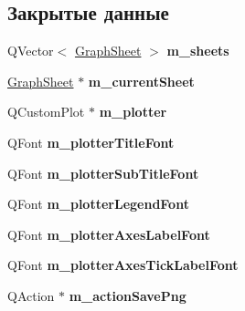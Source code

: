 \subsection*{Закрытые данные}
\begin{DoxyCompactItemize}
\item 
Q\+Vector$<$ \hyperlink{class_graph_sheet}{Graph\+Sheet} $>$ {\bfseries m\+\_\+sheets}\hypertarget{class_graph_window_a03b672b398d6659d8b3c45cb0bb3b678}{}\label{class_graph_window_a03b672b398d6659d8b3c45cb0bb3b678}

\item 
\hyperlink{class_graph_sheet}{Graph\+Sheet} $\ast$ {\bfseries m\+\_\+current\+Sheet}\hypertarget{class_graph_window_afb61e9bb808e6699aa29cd62e92d185a}{}\label{class_graph_window_afb61e9bb808e6699aa29cd62e92d185a}

\item 
Q\+Custom\+Plot $\ast$ {\bfseries m\+\_\+plotter}\hypertarget{class_graph_window_add927bb710c37931242a670757d728ea}{}\label{class_graph_window_add927bb710c37931242a670757d728ea}

\item 
Q\+Font {\bfseries m\+\_\+plotter\+Title\+Font}\hypertarget{class_graph_window_af89ca6d320439fa29acb09381d6b5518}{}\label{class_graph_window_af89ca6d320439fa29acb09381d6b5518}

\item 
Q\+Font {\bfseries m\+\_\+plotter\+Sub\+Title\+Font}\hypertarget{class_graph_window_a050668ab58e0cd8b9284f4ceeba882ff}{}\label{class_graph_window_a050668ab58e0cd8b9284f4ceeba882ff}

\item 
Q\+Font {\bfseries m\+\_\+plotter\+Legend\+Font}\hypertarget{class_graph_window_a4072100eb0280206cb00f254f49e72e0}{}\label{class_graph_window_a4072100eb0280206cb00f254f49e72e0}

\item 
Q\+Font {\bfseries m\+\_\+plotter\+Axes\+Label\+Font}\hypertarget{class_graph_window_a6a2deb2327b56849d617fa00bc38814c}{}\label{class_graph_window_a6a2deb2327b56849d617fa00bc38814c}

\item 
Q\+Font {\bfseries m\+\_\+plotter\+Axes\+Tick\+Label\+Font}\hypertarget{class_graph_window_a7c5bc426aef2b19679ecb9ce7a5f688e}{}\label{class_graph_window_a7c5bc426aef2b19679ecb9ce7a5f688e}

\item 
Q\+Action $\ast$ {\bfseries m\+\_\+action\+Save\+Png}\hypertarget{class_graph_window_a8b18154ef9c7f978df94dbae8855d30a}{}\label{class_graph_window_a8b18154ef9c7f978df94dbae8855d30a}


\end{DoxyCompactItemize}
